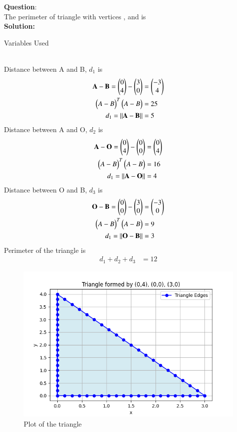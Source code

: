 \documentclass[journal]{IEEEtran}
\begin{document}
\textbf{Question}:\\
The perimeter of triangle with vertices , and  is
\\
\textbf{Solution: }
\begin{table}[h!]    
  \centering
  
  \caption{Variables Used}
  \label{tab10.5.3.9.1}
\end{table}\\
Distance between A and B, $d_1$ is
\begin{align}
    \mathbf{A} - \mathbf{B} = \begin{pmatrix}0\\4\end{pmatrix} - \begin{pmatrix}3\\0\end{pmatrix} &= \begin{pmatrix}-3\\4\end{pmatrix}\\
    \begin{pmatrix}A-B\end{pmatrix}^T\begin{pmatrix}A-B\end{pmatrix}&=25\\
    d_1=||\mathbf{A}-\mathbf{B}||&=5
\end{align}
Distance between A and O, $d_2$ is
\begin{align}
    \mathbf{A} - \mathbf{O} = \begin{pmatrix}0\\4\end{pmatrix} - \begin{pmatrix}0\\0\end{pmatrix} &= \begin{pmatrix}0\\4\end{pmatrix}\\
    \begin{pmatrix}A-B\end{pmatrix}^T\begin{pmatrix}A-B\end{pmatrix}&=16\\
    d_1=||\mathbf{A}-\mathbf{O}||&=4
\end{align}
Distance between O and B, $d_3$ is
\begin{align}
    \mathbf{O} - \mathbf{B} = \begin{pmatrix}0\\0\end{pmatrix} - \begin{pmatrix}3\\0\end{pmatrix} &= \begin{pmatrix}-3\\0\end{pmatrix}\\
    \begin{pmatrix}A-B\end{pmatrix}^T\begin{pmatrix}A-B\end{pmatrix}&=9\\
    d_1=||\mathbf{O}-\mathbf{B}||&=3
\end{align}
Perimeter of the triangle is 
\begin{align}
    d_1+d_2+d_3&=12
\end{align}
\begin{figure}[h!]
   \centering
   \includegraphics[width=0.7\linewidth]{figs/fig.png}
   \caption{Plot of the triangle}
   \label{stemplot}
\end{figure}
\end{document}
